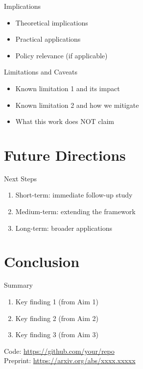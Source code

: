 \documentclass[aspectratio=169,11pt]{beamer}
\begin{document}
\begin{frame}{Implications}
  \begin{itemize}
    \item Theoretical implications
    \item Practical applications
    \item Policy relevance (if applicable)
  \end{itemize}
\end{frame}

\begin{frame}{Limitations and Caveats}
  \begin{itemize}
    \item Known limitation 1 and its impact
    \item Known limitation 2 and how we mitigate
    \item What this work does NOT claim
  \end{itemize}
\end{frame}

\section{Future Directions}

\begin{frame}{Next Steps}
  \begin{enumerate}
    \item Short-term: immediate follow-up study
    \item Medium-term: extending the framework
    \item Long-term: broader applications
  \end{enumerate}
\end{frame}

\section{Conclusion}

\begin{frame}{Summary}
  \begin{enumerate}
    \item Key finding 1 (from Aim 1)
    \item Key finding 2 (from Aim 2)
    \item Key finding 3 (from Aim 3)
  \end{enumerate}
  \vfill
  \small
  Code: \url{https://github.com/your/repo} \\
  Preprint: \url{https://arxiv.org/abs/xxxx.xxxxx}
\end{frame}
\end{document}
